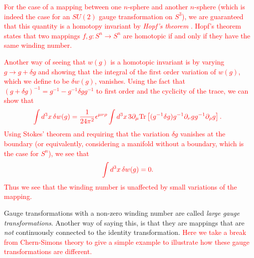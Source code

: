     \textcolor{red}{For the case of a mapping between one $n$-sphere and another $n$-sphere (which is indeed the case  for an $SU(2)$ gauge transformation on $S^3$), we are guaranteed that this quantity is a homotopy invariant by \textit{Hopf's theorem} \cite{Dugundji}. Hopf's theorem states that two mappings $f,g: S^n \rightarrow S^n$ are homotopic if and only if they have the same winding number.}

    \textcolor{red}{Another way of seeing that $w(g)$ is a homotopic invariant is by varying $g\rightarrow g+\delta g$ and showing that the integral of the first order variation of $w(g)$, which we define to be $\delta w(g)$, vanishes. Using the fact that $(g+\delta g)^{-1} = g^{-1} - g^{-1} \delta g g^{-1}$ to first order and the cyclicity of the trace, we can show that}
\begin{align}
    \textcolor{red}{   \int d^3x \, \delta w(g) = \frac{1}{24 \pi^2} \epsilon^{\mu \nu \rho} \int d^3 x \, 3 \partial_{\mu}\mathrm{Tr} \left[(g^{-1} \delta g) g^{-1} \partial_{\nu} g g^{-1} \partial_{\rho} g \right].}
\end{align}
\textcolor{red}{Using Stokes' theorem and requiring that the variation $\delta g$ vanishes at the boundary (or equivalently, considering a manifold without a boundary, which is the case for $S^n$), we see that}
\begin{align}
    \textcolor{red}{ \int d^3 x \, \delta w(g) =0.}
\end{align}
\textcolor{red}{Thus we see that the winding number is unaffected by small variations of the mapping.}

    Gauge transformations with a non-zero winding number are called \textit{large gauge transformations}. Another way of saying this, is that they are mappings that are \textit{not} continuously connected to the identity transformation. \textcolor{red}{Here we take a break from Chern-Simons theory to give a simple example to illustrate how these gauge transformations are different.}

